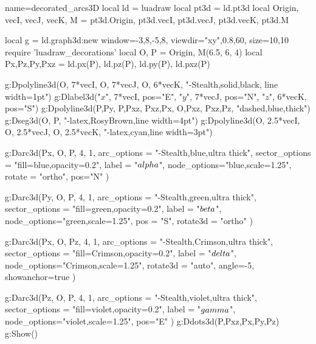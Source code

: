 \begin{luadraw}{name=decorated_arcs3D}
local ld = luadraw
local pt3d = ld.pt3d
local Origin, vecI, vecJ, vecK, M = pt3d.Origin, pt3d.vecI, pt3d.vecJ, pt3d.vecK, pt3d.M

local g = ld.graph3d:new{ window={-3,8,-5,8}, viewdir={"xy",0.8,60}, size={10,10} }
require 'luadraw_decorations'
local O, P = Origin, M(6.5, 6, 4)
local Px,Pz,Py,Pxz = ld.px(P), ld.pz(P), ld.py(P), ld.pxz(P)

g:Dpolyline3d({{O, 7*vecI}, {O, 7*vecJ}, {O, 6*vecK}}, "-Stealth,solid,black, line width=1pt")
g:Dlabel3d("$x$", 7*vecI, {pos="E"}, "$y$", 7*vecJ, {pos="N"}, "$z$", 6*vecK, {pos="S"})
g:Dpolyline3d({{P,Py}, {P,Pxz}, {Pxz,Px}, {O,Pxz}, {Pxz,Pz}}, "dashed,blue,thick")
g:Dseg3d({O, P}, "-latex,RosyBrown,line width=4pt")
g:Dpolyline3d({{O, 2.5*vecI}, {O, 2.5*vecJ}, {O, 2.5*vecK}}, "-latex,cyan,line width=3pt")

g:Darc3d(Px, O, P, 4, 1, {
    arc_options = "-Stealth,blue,ultra thick",
    sector_options = "fill=blue,opacity=0.2",
    label = "$\\alpha$", node_options="blue,scale=1.25",
    rotate = "ortho", pos="N" })
     
g:Darc3d(Py, O, P, 4, 1, {
    arc_options = "-Stealth,green,ultra thick",
    sector_options = "fill=green,opacity=0.2",
    label = "$\\beta$", node_options="green,scale=1.25",
    pos = "S", rotate3d = "ortho"  }) 
     
g:Darc3d(Px, O, Pz, 4, 1, {
    arc_options = "-Stealth,Crimson,ultra thick",
    sector_options = "fill=Crimson,opacity=0.2",
    label = "$\\delta$", node_options="Crimson,scale=1.25",
    rotate3d = "auto", angle=-5,
    showanchor=true  })  

g:Darc3d(Pz, O, P, 4, 1, {
    arc_options = "-Stealth,violet,ultra thick",
    sector_options = "fill=violet,opacity=0.2",
    label = "$\\gamma$", node_options="violet,scale=1.25",
    pos="E"  }) 
g:Ddots3d({P,Pxz,Px,Py,Pz})     
g:Show()
\end{luadraw}
